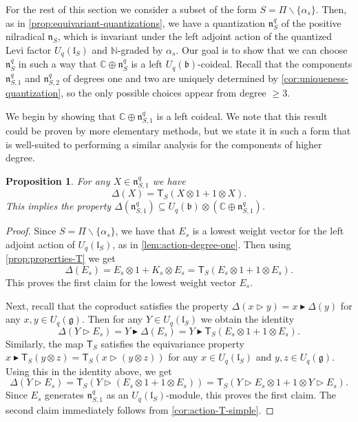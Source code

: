 \documentclass[a4paper, 12pt, reqno, english]{amsart}
\numberwithin{equation}{section}
\numberwithin{figure}{section}
\theoremstyle{plain}
\theoremstyle{plain}
\theoremstyle{plain}
\newtheorem{proposition}[theorem]{Proposition}
\theoremstyle{plain}
\theoremstyle{plain}
\theoremstyle{definition}
\theoremstyle{definition}
\theoremstyle{definition}
\theoremstyle{remark}
\theoremstyle{definition}
\theoremstyle{definition}
\newcommand{\Uqb}{U_q(\mathfrak{b})}
\newcommand{\Uqg}{U_q(\mathfrak{g})}
\newcommand{\UqlS}{U_q(\mathfrak{l}_S)}
\newcommand{\bbC}{\mathbb{C}}
\newcommand{\bbN}{\mathbb{N}}
\newcommand{\lien}{\mathfrak{n}}
\newcommand{\simpleroots}{\Pi}
\newcommand{\tmapS}{\mathsf{T}_S}
\newcommand{\qnil}{\lien^q}
\begin{document}
For the rest of this section we consider a subset of the form $S = \simpleroots \backslash \{\alpha_s\}$.
Then, as in \cref{prop:equivariant-quantizations}, we have a quantization $\qnil_S$ of the positive nilradical $\lien_S$, which is invariant under the left adjoint action of the quantized Levi factor $\UqlS$ and $\bbN$-graded by $\alpha_s$.
Our goal is to show that we can choose $\qnil_S$ in such a way that $\bbC \oplus \qnil_S$ is a left $\Uqb$-coideal.
Recall that the components $\qnil_{S, 1}$ and $\qnil_{S, 2}$ of degrees one and two are uniquely determined by \cref{cor:uniqueness-quantization}, so the only possible choices appear from degree $\geq 3$.

We begin by showing that $\bbC \oplus \qnil_{S, 1}$ is a left coideal.
We note that this result could be proven by more elementary methods, but we state it in such a form that is well-suited to performing a similar analysis for the components of higher degree.

\begin{proposition}
\label{prop:coideal-degree-one}
For any $X \in \lien^q_{S, 1}$ we have
\[
\Delta(X) = \tmapS(X \otimes 1 + 1 \otimes X).
\]
This implies the property $\Delta(\qnil_{S, 1}) \subseteq \Uqb \otimes (\bbC \oplus \qnil_{S, 1})$.
\end{proposition}

\begin{proof}
Since $S = \simpleroots \backslash \{\alpha_s\}$, we have that $E_s$ is a lowest weight vector for the left adjoint action of $\UqlS$, as in \cref{lem:action-degree-one}.
Then using \cref{prop:properties-T} we get
\[
\Delta(E_s) = E_s \otimes 1 + K_s \otimes E_s = \tmapS (E_s \otimes 1 + 1 \otimes E_s).
\]
This proves the first claim for the lowest weight vector $E_s$.

Next, recall that the coproduct satisfies the property $\Delta(x \triangleright y) = x \blacktriangleright \Delta(y)$ for any $x, y \in \Uqg$.
Then for any $Y \in \UqlS$ we obtain the identity
\[
\Delta(Y \triangleright E_s) = Y \blacktriangleright \Delta(E_s) = Y \blacktriangleright \tmapS (E_s \otimes 1 + 1 \otimes E_s).
\]
Similarly, the map $\tmapS$ satisfies the equivariance property $x \blacktriangleright \tmapS(y \otimes z) = \tmapS(x \triangleright (y \otimes z))$ for any $x \in \UqlS$ and $y, z \in \Uqg$.
Using this in the identity above, we get
\[
\Delta(Y \triangleright E_s) = \tmapS (Y \triangleright (E_s \otimes 1 + 1 \otimes E_s)) = \tmapS (Y \triangleright E_s \otimes 1 + 1 \otimes Y \triangleright E_s).
\]
Since $E_s$ generates $\qnil_{S, 1}$ as an $\UqlS$-module, this proves the first claim.
The second claim immediately follows from \cref{cor:action-T-simple}.
\end{proof}
\end{document}
